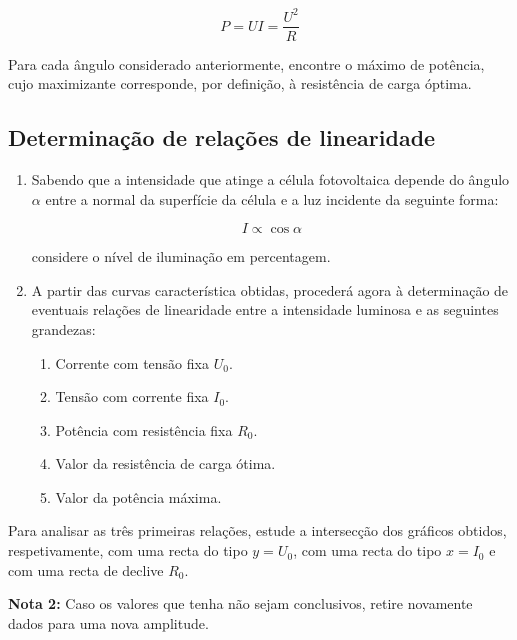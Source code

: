 \documentclass[10pt]{extarticle}
\begin{document}
\begin{multicols}{2}
\begin{equation} \label{eq2}
P=UI=\frac{U^2}{R}
\end{equation}

\item Para cada ângulo considerado anteriormente, encontre o máximo de potência, cujo maximizante corresponde, por definição, à resistência de carga óptima.

\subsection{Determinação de relações de linearidade}

\begin{enumerate}

\item Sabendo que a intensidade que atinge a célula fotovoltaica depende do ângulo $\alpha$ entre a normal da superfície da célula e a luz incidente da seguinte forma:

\begin{equation}
I\propto\cos{\alpha}
\end{equation}

\par\noindent considere o nível de iluminação em percentagem.

\item A partir das curvas característica obtidas, procederá agora à determinação de eventuais relações de linearidade entre a intensidade luminosa e as seguintes grandezas:
\begin{enumerate}
\item Corrente com tensão fixa $U_0$.
\item Tensão com corrente fixa $I_0$.
\item Potência com resistência fixa $R_0$.
\item Valor da resistência de carga ótima.
\item Valor da potência máxima.
\end{enumerate}
\end{enumerate}

\par Para analisar as três primeiras relações, estude a intersecção dos gráficos obtidos, respetivamente, com uma recta do tipo $y=U_0$, com uma recta do tipo $x=I_0$ e com uma recta de declive $R_0$.
\par\noindent \textbf{Nota 2:} Caso os valores que tenha não sejam conclusivos, retire novamente dados para uma nova amplitude.


\end{multicols}
\end{document}
